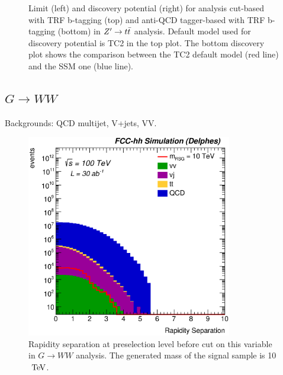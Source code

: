 \documentclass{cernrep}
\begin{document}
\begin{figure}[!htb]
\caption{Limit (left) and discovery potential (right) for analysis cut-based with TRF b-tagging (top) and anti-QCD tagger-based with TRF b-tagging (bottom) in $Z^{\prime} \rightarrow t\bar{t}$ analysis. Default model used for discovery potential is TC2 in the top plot. The bottom discovery plot shows the comparison between the TC2 default model (red line) and the SSM one (blue line).}
\label{fig:Zptt_limit_trf}
\end{figure}


\subsection{$G \rightarrow WW$}
\label{subsec:RSGww}

Backgrounds: QCD multijet, V+jets, VV.

\begin{figure}[!htb]\centering
\includegraphics[width=0.8\textwidth]{Fig/RSGww/rapiditySeparation_sel0_before_cut_nostack_log.eps}
\caption{Rapidity separation at preselection level before cut on this variable in $G \rightarrow WW$ analysis. The generated mass of the signal sample is 10 $\TeV$.}
\label{fig:RSGww_sel0_rapidity}
\end{figure}
\end{document}
